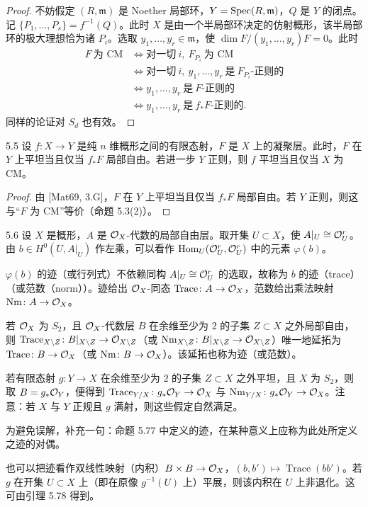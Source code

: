 \begin{proof}
不妨假定 $(R,\mathfrak{m})$ 是 Noether 局部环，$Y=\operatorname{Spec}(R,\mathfrak{m})$，$Q$ 是 $Y$ 的闭点。记 $\{P_1,\dots,P_s\}=f^{-1}(Q)$。此时 $X$ 是由一个半局部环决定的仿射概形，该半局部环的极大理想恰为诸 $P_i$。选取 $y_1,\dots,y_r\in\mathfrak{m}$，使 $\dim F/(y_1,\dots,y_r)F=0$。此时
\[
\begin{aligned}
F\ \text{为 CM} &\iff \text{对一切}\ i,\ F_{P_i}\ \text{为 CM}\\
&\iff \text{对一切}\ i,\ y_1,\dots,y_r\ \text{是}\ F_{P_i}\text{-正则的}\\
&\iff y_1,\dots,y_r\ \text{是}\ F\text{-正则的}\\
&\iff y_1,\dots,y_r\ \text{是}\ f_*F\text{-正则的}.
\end{aligned}
\]
同样的论证对 $S_d$ 也有效。
\end{proof}

\begin{corollaryp}{5.5}
设 $f\colon X\to Y$ 是纯 $n$ 维概形之间的有限态射，$F$ 是 $X$ 上的凝聚层。此时，$F$ 在 $Y$ 上平坦当且仅当 $f_*F$ 局部自由。若进一步 $Y$ 正则，则 $f$ 平坦当且仅当 $X$ 为 CM。
\end{corollaryp}

\begin{proof}
由 [Mat69, 3.G]，$F$ 在 $Y$ 上平坦当且仅当 $f_*F$ 局部自由。若 $Y$ 正则，则这与“$F$ 为 CM”等价（命题 5.3(2)）。
\end{proof}

\begin{definition}{5.6}
设 $X$ 是概形，$A$ 是 $\mathcal{O}_X$-代数的局部自由层。取开集 $U\subset X$，使 $A|_U\cong\mathcal{O}_U^r$。由 $b\in H^0(U,A|_U)$ 作左乘，可以看作 $\operatorname{Hom}_U(\mathcal{O}_U^r,\mathcal{O}_U^r)$ 中的元素 $\varphi(b)$。

$\varphi(b)$ 的迹（或行列式）不依赖同构 $A|_U\cong\mathcal{O}_U^r$ 的选取，故称为 $b$ 的迹（trace）（或范数（norm））。迹给出 $\mathcal{O}_X$-同态 $\operatorname{Trace}\colon A\to\mathcal{O}_X$，范数给出乘法映射 $\operatorname{Nm}\colon A\to\mathcal{O}_X$。

若 $\mathcal{O}_X$ 为 $S_2$，且 $\mathcal{O}_X$-代数层 $B$ 在余维至少为 $2$ 的子集 $Z\subset X$ 之外局部自由，则 $\operatorname{Trace}_{X\setminus Z}\colon B|_{X\setminus Z}\to\mathcal{O}_{X\setminus Z}$（或 $\operatorname{Nm}_{X\setminus Z}\colon B|_{X\setminus Z}\to\mathcal{O}_{X\setminus Z}$）唯一地延拓为 $\operatorname{Trace}\colon B\to\mathcal{O}_X$（或 $\operatorname{Nm}\colon B\to\mathcal{O}_X$）。该延拓也称为迹（或范数）。

若有限态射 $g\colon Y\to X$ 在余维至少为 $2$ 的子集 $Z\subset X$ 之外平坦，且 $X$ 为 $S_2$，则取 $B=g_*\mathcal{O}_Y$，便得到 $\operatorname{Trace}_{Y/X}\colon g_*\mathcal{O}_Y\to\mathcal{O}_X$ 与 $\operatorname{Nm}_{Y/X}\colon g_*\mathcal{O}_Y\to\mathcal{O}_X$。注意：若 $X$ 与 $Y$ 正规且 $g$ 满射，则这些假定自然满足。

为避免误解，补充一句：命题 5.77 中定义的迹，在某种意义上应称为此处所定义之迹的对偶。

也可以把迹看作双线性映射（内积）$B\times B\to\mathcal{O}_X$，$(b,b')\mapsto\operatorname{Trace}(bb')$。若 $g$ 在开集 $U\subset X$ 上（即在原像 $g^{-1}(U)$ 上）平展，则该内积在 $U$ 上非退化。这可由引理 5.78 得到。
\end{definition}

